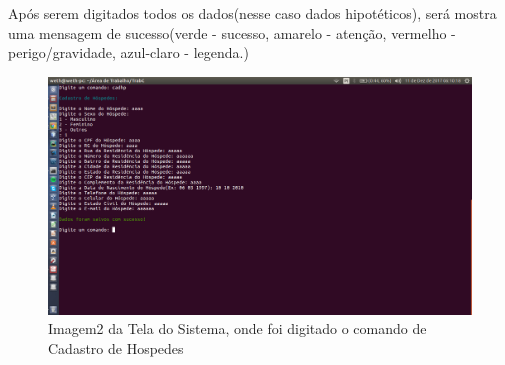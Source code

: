 \documentclass{article}
\begin{document}
\newpage
Após serem digitados todos os dados(nesse caso dados hipotéticos), será mostra uma mensagem de sucesso(verde - sucesso, amarelo - atenção, vermelho - perigo/gravidade, azul-claro - legenda.)
\begin{figure}[!htb]
\centering
\includegraphics[width=15cm]{img4.png}
\caption{Imagem2 da Tela do Sistema, onde foi digitado o comando de Cadastro de Hospedes}
\label{Rotulo}
\end{figure}
\end{document}
